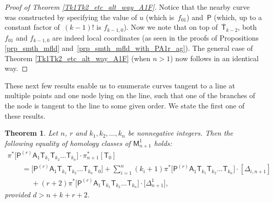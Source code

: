 \documentclass[pdftex]{sigma}
\numberwithin{equation}{section}
\newtheorem{thm}{Theorem}[section]
\begin{document}
\begin{proof}[Proof of Theorem \ref{Tk1Tk2_etc_alt_way_A1F}]
Notice that the nearby curve was constructed by specifying the value of
$u$ (which is~$f_{01}$) and~$\mathsf{P}$ (which, up to a constant factor of~$(k-1)!$ is $f_{k-1, 0}$). Now we note that on top of~$\overline{\mathsf{T}}_{k-2}$, both~$f_{01}$ and $f_{k-1,0}$ are indeed
local coordinates (as seen in the proofs of
Propositions \ref{prp_smth_mfld} and~\ref{prp_smth_mfld_with_PA1r_ag}).
The general case of Theorem \ref{Tk1Tk2_etc_alt_way_A1F} (when $n>1$)
now follows in an identical way.
\end{proof}

These next few results enable us to enumerate curves
tangent to a line at multiple points and one node lying on the line, such that one of the
branches of the node is tangent to the line to some given order.
We state the first one of these results.

\begin{thm}\label{theorem_for_many_tks_ag_pakL}
Let $n$, $r$ and $k_1, k_2,\dots, k_n$ be nonnegative integers.
Then the following equality of homology classes of $\mathsf{M}_{n+1}^1$ holds:
\begin{gather}
\pi^{\ast} \bigl[\mathsf{P}^{(r)} \mathsf{A}_1 \mathsf{T}_{k_1} \mathsf{T}_{k_2} \dots \mathsf{T}_{k_n} \bigr]\cdot
\pi_{n+1}^{\ast} [\mathsf{T}_0]\nonumber \\
\qquad =
\bigl[\mathsf{P}^{(r)} \mathsf{A}_1 \mathsf{T}_{k_1}\mathsf{T}_{k_2} \dots \mathsf{T}_{k_n} \mathsf{T}_{0}\bigr]
 + \sum_{i=1}^{n} (k_i+1) \pi^{\ast} \bigl[\mathsf{P}^{(r)} \mathsf{A}_1 \mathsf{T}_{k_1} \mathsf{T}_{k_2}\dots \mathsf{T}_{k_n}\bigr] \cdot [\Delta_{i, {n+1}}] \nonumber \\
\phantom{\qquad =}{} + (r+2) \pi^{\ast} \bigl[\mathsf{P}^{(r)} \mathsf{A}_1 \mathsf{T}_{k_1} \mathsf{T}_{k_2}
\dots \mathsf{T}_{k_n}\bigr] \cdot \bigl[\Delta_{{n+1}}^1\bigr],\label{many_tks_ag_pakL}
\end{gather}
provided $d > n+k+r+2$.
\end{thm}
\end{document}
